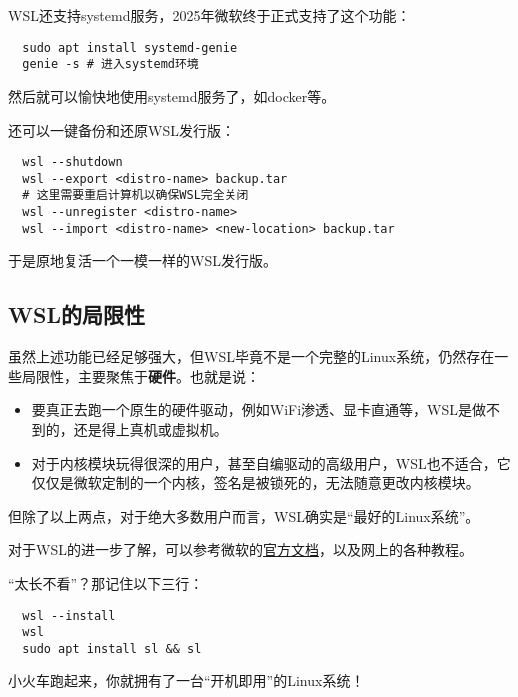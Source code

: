 WSL还支持systemd服务，2025年微软终于正式支持了这个功能：
\begin{lstlisting}
  sudo apt install systemd-genie
  genie -s # 进入systemd环境
\end{lstlisting}
然后就可以愉快地使用systemd服务了，如docker等。

还可以一键备份和还原WSL发行版：
\begin{lstlisting}
  wsl --shutdown
  wsl --export <distro-name> backup.tar
  # 这里需要重启计算机以确保WSL完全关闭
  wsl --unregister <distro-name>
  wsl --import <distro-name> <new-location> backup.tar
\end{lstlisting}
于是原地复活一个一模一样的WSL发行版。

\subsection{WSL的局限性}

虽然上述功能已经足够强大，但WSL毕竟不是一个完整的Linux系统，仍然存在一些局限性，主要聚焦于\textbf{硬件}。也就是说：
\begin{itemize}
  \item 要真正去跑一个原生的硬件驱动，例如WiFi渗透、显卡直通等，WSL是做不到的，还是得上真机或虚拟机。
  \item 对于内核模块玩得很深的用户，甚至自编驱动的高级用户，WSL也不适合，它仅仅是微软定制的一个内核，签名是被锁死的，无法随意更改内核模块。
\end{itemize}
但除了以上两点，对于绝大多数用户而言，WSL确实是“最好的Linux系统”。

对于WSL的进一步了解，可以参考微软的\href{https://learn.microsoft.com/en-us/windows/wsl/}{官方文档}，以及网上的各种教程。

“太长不看”？那记住以下三行：
\begin{lstlisting}
  wsl --install
  wsl
  sudo apt install sl && sl
\end{lstlisting}
小火车跑起来，你就拥有了一台“开机即用”的Linux系统！

